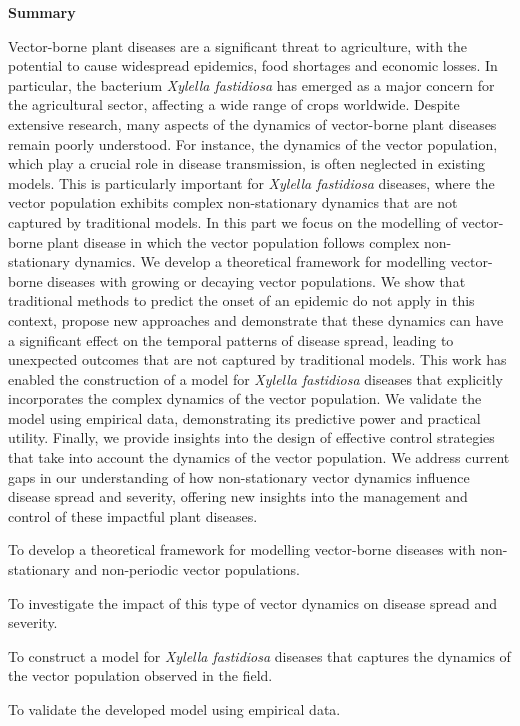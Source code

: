 \thispagestyle{empty}

\begin{center}
    \textbf{\Large Summary}
\end{center}

Vector-borne plant diseases are a significant threat to agriculture, with the
potential to cause widespread epidemics, food shortages and economic losses.
In particular, the bacterium \textit{Xylella fastidiosa} has emerged as a major
concern for the agricultural sector, affecting a wide range of crops worldwide.
Despite extensive research, many aspects of the dynamics of vector-borne plant
diseases remain poorly understood. For instance, the dynamics of the vector
population, which play a crucial role in disease transmission, is often
neglected in existing models. This is particularly important for
\textit{Xylella fastidiosa} diseases, where the vector population exhibits
complex non-stationary dynamics that are not captured by traditional
models. In this part we focus on the modelling of vector-borne plant disease in
which the vector population follows complex non-stationary dynamics. We develop
a theoretical framework for modelling vector-borne diseases with growing or
decaying vector populations. We show that traditional methods to
predict the onset of an epidemic do not apply in this context, propose new
approaches and demonstrate that these dynamics can have a significant
effect on the temporal patterns of disease spread, leading to unexpected
outcomes that are not captured by traditional models. This work has
enabled the construction of a model for \textit{Xylella fastidiosa} diseases
that explicitly incorporates the complex dynamics of the vector population. We
validate the model using empirical data, demonstrating its predictive power and
practical utility. Finally, we provide insights into the design of effective
control strategies that take into account the dynamics of the vector
population. We address current gaps in our understanding of how non-stationary
vector dynamics influence disease spread and severity, offering new insights
into the management and control of these impactful plant diseases.

\vspace{1cm}

\begin{objectiveslist}
    \item To develop a theoretical framework for modelling vector-borne
    diseases with non-stationary and non-periodic vector populations.

    \item To investigate the impact of this type of vector dynamics on
    disease spread and severity.

    \item To construct a model for \textit{Xylella fastidiosa} diseases that
    captures the dynamics of the vector population observed in the field.

    \item To validate the developed model using empirical data.

\end{objectiveslist}


